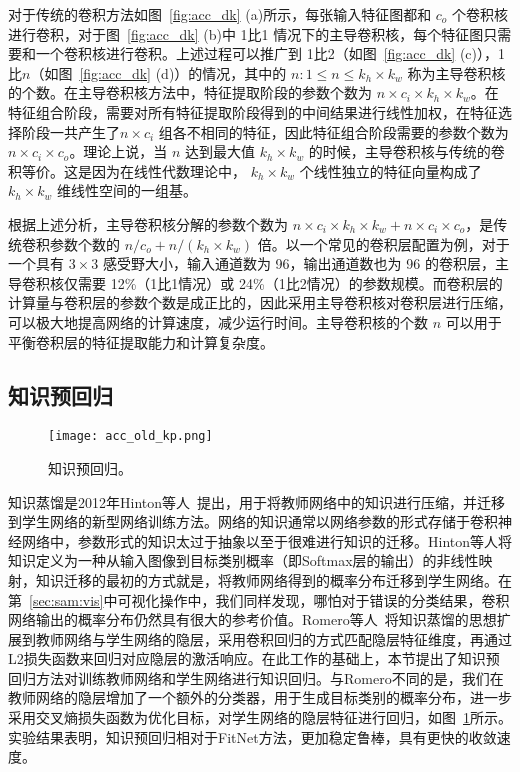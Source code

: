 对于传统的卷积方法如图~\ref{fig:acc_dk} (a)所示，每张输入特征图都和 $c_o$ 个卷积核进行卷积，对于图~\ref{fig:acc_dk} (b)中 1比1 情况下的主导卷积核，每个特征图只需要和一个卷积核进行卷积。上述过程可以推广到 1比2（如图~\ref{fig:acc_dk} (c)），1比$n$（如图~\ref{fig:acc_dk} (d)）的情况，其中的 $n: 1{\le}n{\le}k_h{\times}k_w$ 称为主导卷积核的个数。在主导卷积核方法中，特征提取阶段的参数个数为 $n{\times}c_i{\times}k_h{\times}k_w$。在特征组合阶段，需要对所有特征提取阶段得到的中间结果进行线性加权，在特征选择阶段一共产生了$n{\times}c_i$ 组各不相同的特征，因此特征组合阶段需要的参数个数为 $n{\times}c_i{\times}c_o$。理论上说，当 $n$ 达到最大值 $k_h{\times}k_w$ 的时候，主导卷积核与传统的卷积等价。这是因为在线性代数理论中， $k_h{\times}k_w$ 个线性独立的特征向量构成了 $k_h{\times}k_w$ 维线性空间的一组基。

根据上述分析，主导卷积核分解的参数个数为  $n{\times}c_i{\times}k_h{\times}k_w+n{\times}c_i{\times}c_o$，是传统卷积参数个数的 $n/c_o+n/(k_h{\times}k_w)$ 倍。以一个常见的卷积层配置为例，对于一个具有 $3{\times}3$ 感受野大小，输入通道数为 96，输出通道数也为 96 的卷积层，主导卷积核仅需要 12\%（1比1情况）或 24\%（1比2情况）的参数规模。而卷积层的计算量与卷积层的参数个数是成正比的，因此采用主导卷积核对卷积层进行压缩，可以极大地提高网络的计算速度，减少运行时间。主导卷积核的个数 $n$ 可以用于平衡卷积层的特征提取能力和计算复杂度。

\subsection{知识预回归}
\label{sec:acc:model:kp}

\begin{figure}[t]
\centering
\centerline{\texttt{[image: acc\_old\_kp.png]}}
\caption{知识预回归。}
\label{fig:acc_kp}
\end{figure} 

知识蒸馏是2012年Hinton等人~\cite{hinton2015distilling}提出，用于将教师网络中的知识进行压缩，并迁移到学生网络的新型网络训练方法。网络的知识通常以网络参数的形式存储于卷积神经网络中，参数形式的知识太过于抽象以至于很难进行知识的迁移。Hinton等人将知识定义为一种从输入图像到目标类别概率（即Softmax层的输出）的非线性映射，知识迁移的最初的方式就是，将教师网络得到的概率分布迁移到学生网络。在第~\ref{sec:sam:vis}中可视化操作中，我们同样发现，哪怕对于错误的分类结果，卷积网络输出的概率分布仍然具有很大的参考价值。Romero等人~\cite{romero2014fitnets}将知识蒸馏的思想扩展到教师网络与学生网络的隐层，采用卷积回归的方式匹配隐层特征维度，再通过L2损失函数来回归对应隐层的激活响应。在此工作的基础上，本节提出了知识预回归方法对训练教师网络和学生网络进行知识回归。与Romero不同的是，我们在教师网络的隐层增加了一个额外的分类器，用于生成目标类别的概率分布，进一步采用交叉熵损失函数为优化目标，对学生网络的隐层特征进行回归，如图~\ref{fig:acc_kp}所示。实验结果表明，知识预回归相对于FitNet方法，更加稳定鲁棒，具有更快的收敛速度。

